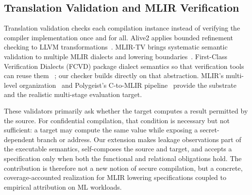 \subsection{Translation Validation and MLIR Verification}

Translation validation checks each compilation instance instead of verifying the compiler implementation once and for all.
Alive2 applies bounded refinement checking to LLVM transformations~\cite{lopes2021alive2}.
MLIR-TV brings systematic semantic validation to multiple MLIR dialects and lowering boundaries~\cite{wang2024mlirtv}.
First-Class Verification Dialects (FCVD) package dialect semantics so that verification tools can reuse them ~\cite{fcvd2025}; our checker builds directly on that abstraction.
MLIR's multi-level organization~\cite{lattner2021mlir} and Polygeist's C-to-MLIR pipeline~\cite{moses2021polygeist} provide the substrate and the realistic multi-stage evaluation target.

These validators primarily ask whether the target computes a result permitted by the source.
For confidential compilation, that condition is necessary but not sufficient: a target may compute the same value while exposing a secret-dependent branch or address.
Our extension makes leakage observations part of the executable semantics, self-composes the source and target, and accepts a specification only when both the functional and relational obligations hold.
The contribution is therefore not a new notion of secure compilation, but a concrete, coverage-accounted realization for MLIR lowering specifications coupled to empirical attribution on ML workloads.
